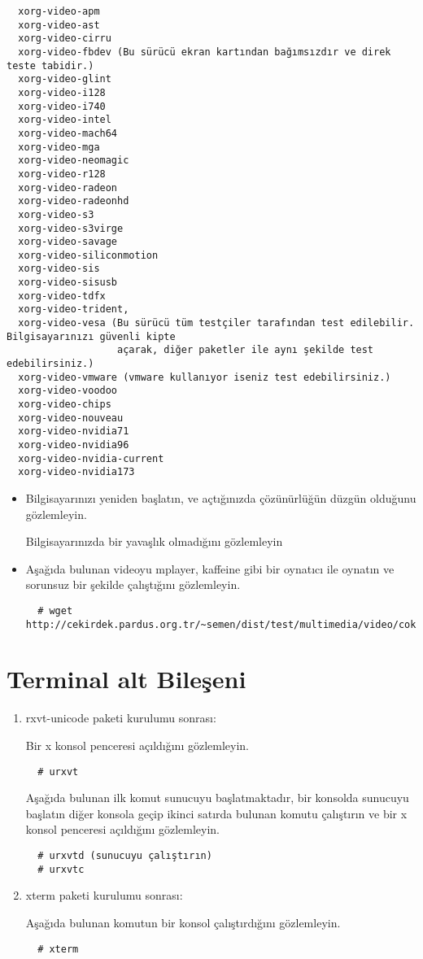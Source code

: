 \documentclass[a4paper,10pt]{article}
\begin{document}
\begin{enumerate}
\begin{verbatim}
  xorg-video-apm 
  xorg-video-ast
  xorg-video-cirru
  xorg-video-fbdev (Bu sürücü ekran kartından bağımsızdır ve direk teste tabidir.)
  xorg-video-glint
  xorg-video-i128
  xorg-video-i740
  xorg-video-intel
  xorg-video-mach64
  xorg-video-mga
  xorg-video-neomagic
  xorg-video-r128
  xorg-video-radeon
  xorg-video-radeonhd
  xorg-video-s3
  xorg-video-s3virge
  xorg-video-savage
  xorg-video-siliconmotion
  xorg-video-sis
  xorg-video-sisusb
  xorg-video-tdfx
  xorg-video-trident,
  xorg-video-vesa (Bu sürücü tüm testçiler tarafından test edilebilir. Bilgisayarınızı güvenli kipte
                   açarak, diğer paketler ile aynı şekilde test edebilirsiniz.)
  xorg-video-vmware (vmware kullanıyor iseniz test edebilirsiniz.)
  xorg-video-voodoo
  xorg-video-chips
  xorg-video-nouveau
  xorg-video-nvidia71
  xorg-video-nvidia96
  xorg-video-nvidia-current
  xorg-video-nvidia173
\end{verbatim}

\begin{itemize}
  \item Bilgisayarınızı yeniden başlatın, ve açtığınızda çözünürlüğün düzgün olduğunu gözlemleyin.

  Bilgisayarınızda bir yavaşlık olmadığını gözlemleyin
  \item Aşağıda bulunan videoyu mplayer, kaffeine gibi bir oynatıcı ile oynatın ve sorunsuz bir şekilde çalıştığını gözlemleyin.
  \begin{verbatim}
  # wget http://cekirdek.pardus.org.tr/~semen/dist/test/multimedia/video/cokluortam/DVD.mpg
  \end{verbatim}
\end{itemize}

\end{enumerate}

\section{Terminal alt Bileşeni}
\begin{enumerate}
  \item rxvt-unicode paketi kurulumu sonrası:

  Bir x konsol penceresi açıldığını gözlemleyin.
  \begin{verbatim}
  # urxvt
  \end{verbatim}

  Aşağıda bulunan ilk komut sunucuyu başlatmaktadır, bir konsolda sunucuyu başlatın diğer konsola geçip ikinci satırda bulunan komutu çalıştırın ve bir x konsol penceresi açıldığını gözlemleyin.
  \begin{verbatim}
  # urxvtd (sunucuyu çalıştırın)
  # urxvtc
  \end{verbatim}

  \item xterm paketi kurulumu sonrası:

  Aşağıda bulunan komutun bir konsol çalıştırdığını gözlemleyin.
  \begin{verbatim}
  # xterm
  \end{verbatim}
\end{enumerate}
\end{document}
